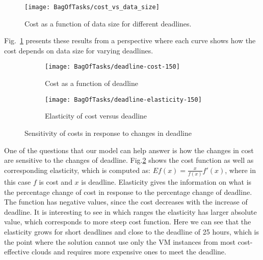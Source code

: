 {  \begin{figure}[tb]
     \centering \texttt{[image: BagOfTasks/cost\_vs\_data\_size]}
     \caption{Cost as a function of data size for different
     deadlines.\label{fig:bot:cost_vs_data_size}}
  \end{figure} 
  
  Fig.~\ref{fig:bot:cost_vs_data_size} presents these results from a perspective
  where each curve shows how the cost depends on data size for varying
  deadlines.
  
  \begin{figure}[tb]
     \centering 
     \begin{subfigure}[b]{0.49\textwidth}
       \centering       
       \texttt{[image: BagOfTasks/deadline-cost-150]}
       \caption{Cost as a function of deadline}
     \end{subfigure}     
     \begin{subfigure}[b]{0.49\textwidth}
       \centering       
       \texttt{[image: BagOfTasks/deadline-elasticity-150]}
       \caption{Elasticity of cost versus deadline}
     \end{subfigure}     
     \caption{Sensitivity of costs in response to changes in deadline}
     \label{fig:bot:elasticity}
  \end{figure} 
  One of the questions that our model can help answer is how the changes in
  cost are sensitive to the changes of deadline. Fig.\ref{fig:bot:elasticity} shows
  the cost function as well as corresponding elasticity, which is computed as:
  $E f(x) = \frac{x}{f(x)} f'(x)$, where in this case $f$ is cost and $x$ is
  deadline. Elasticity gives the information on what is the percentage change
  of cost in response to the percentage change of deadline. The function has
  negative values, since the cost decreases with the increase of deadline. It
  is interesting to see in which ranges the elasticity has larger absolute
  value, which corresponds to more steep cost function. Here we can see that
  the elasticity grows for short deadlines and close to the deadline of 25
  hours, which is the point where the solution cannot use only the VM instances
  from most cost-effective clouds and requires more expensive ones to meet the
  deadline.
  
}

